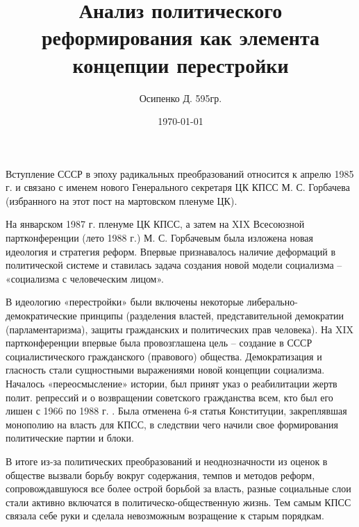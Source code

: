 \documentclass[a4paper, 12pt]{article}
\title{Анализ политического реформирования как элемента концепции перестройки}
\author{Осипенко Д. 595гр.}
\date{\today}
\begin{document}
\sffamily
\maketitle
Вступление СССР в эпоху радикальных преобразований относится к апрелю 1985 г. и связано с именем нового Генерального секретаря ЦК КПСС М. С. Горбачева (избранного на этот пост на мартовском пленуме ЦК).

На январском 1987 г. пленуме ЦК КПСС, а затем на XIX Всесоюзной партконференции (лето 1988 г.) М. С. Горбачевым была изложена новая идеология и стратегия реформ. Впервые признавалось наличие деформаций в политической системе и ставилась задача создания новой модели социализма – «социализма с человеческим лицом».

В идеологию «перестройки» были включены некоторые либерально-демократические принципы (разделения властей, представительной демократии (парламентаризма), защиты гражданских и политических прав человека). На XIX партконференции впервые была провозглашена цель – создание в СССР социалистического гражданского (правового) общества. Демократизация и гласность стали сущностными выражениями новой концепции социализма. Началось «переосмысление» истории, был принят указ о реабилитации жертв полит. репрессий и о возвращении советского гражданства всем, кто был его лишен с 1966 по 1988 г. . Была отменена 6-я статья Конституции, закреплявшая монополию на власть для КПСС, в следствии чего начили свое формирования политические партии и блоки. 

В итоге из-за политических преобразований и неоднозначности из оценок в обществе вызвали борьбу вокруг содержания, темпов и методов реформ, сопровождавшуюся все более острой борьбой за власть, разные социальные слои стали активно включатся в политическо-общественную жизнь. Тем самым КПСС связала себе руки и сделала невозможным возращение к старым порядкам.
\end{document}
